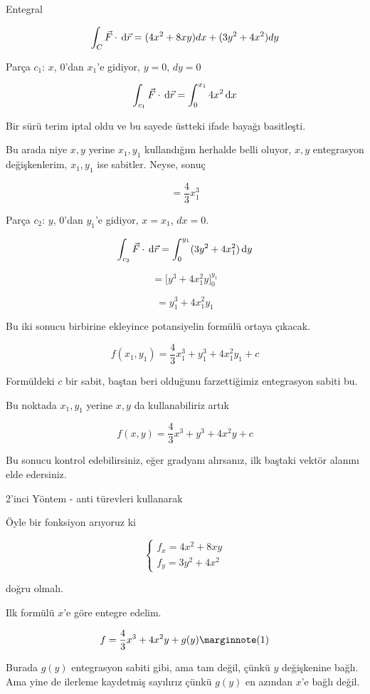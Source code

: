 \documentclass[12pt,fleqn]{article}\usepackage{../../common}
\begin{document}
Entegral

$$ \int_C \vec{F} \cdot \,\mathrm{d}\vec{r} = 
(4x^2 + 8xy) dx + (3y^2 + 4x^2) dy
$$

Parça $c_1$: $x$, 0'dan $x_1$'e gidiyor, $y=0$, $dy = 0$

$$
\int_{c_1} \vec{F} \cdot \,\mathrm{d}\vec{r} =  \int_0^{x_1} 4x^2 \,\mathrm{d} x 
$$

Bir sürü terim iptal oldu ve bu sayede üstteki ifade bayağı basitleşti. 

Bu arada niye $x,y$ yerine $x_1,y_1$ kullandığım herhalde belli oluyor,
$x,y$ entegrasyon değişkenlerim, $x_1,y_1$ ise sabitler. Neyse, sonuç

$$ = \frac{4}{3} x_1^3$$

Parça $c_2$: $y$, 0'dan $y_1$'e gidiyor, $x=x_1$, $dx = 0$. 

$$
\int_{c_2} \vec{F} \cdot \,\mathrm{d}\vec{r} = 
\int_0^{y_1} (3y^2 + 4x_1^2) \,\mathrm{d} y
$$

$$ = \bigg[ y^3 + 4x_1^2y \bigg]_0^{y_1} $$

$$ = y_1^3 + 4x_1^2y_1 $$

Bu iki sonucu birbirine ekleyince potansiyelin formülü ortaya çıkacak.

$$ f(x_1,y_1) = \frac{4}{3} x_1^3 + y_1^3 + 4x_1^2y_1 + c$$

Formüldeki $c$ bir sabit, baştan beri olduğunu farzettiğimiz entegrasyon
sabiti bu. 

Bu noktada $x_1,y_1$ yerine $x,y$ da kullanabiliriz artık

$$ f(x,y) = \frac{4}{3} x^3 + y^3 + 4x^2y + c$$

Bu sonucu kontrol edebilirsiniz, eğer gradyanı alırsanız, ilk baştaki vektör
alanını elde edersiniz.

2'inci Yöntem - anti türevleri kullanarak

Öyle bir fonksiyon arıyoruz ki 

$$ 
\left\{ \begin{array}{l}
f_x = 4x^2 + 8xy \\
f_y = 3y^2 + 4x^2
\end{array} \right.
$$

doğru olmalı. 

Ilk formülü $x$'e göre entegre edelim. 

$$ f = \frac{4}{3}x^3 + 4x^2y + g(y)
\mlabel{1}$$

Burada $g(y)$ entegrasyon sabiti gibi, ama tam değil, çünkü $y$ değişkenine
bağlı. Ama yine de ilerleme kaydetmiş sayılırız çünkü $g(y)$ en azından $x$'e
bağlı değil.
\end{document}
